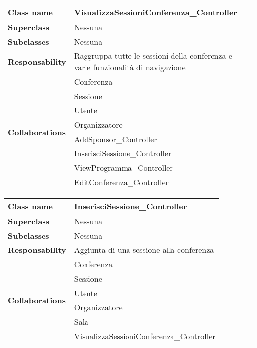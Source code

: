 \begin{table}[h!]
	\begin{tabular}{|l|l|}
		\hline 
		\textbf{Class name} & VisualizzaSessioniConferenza\_Controller
		\\ \hline
		\textbf{Superclass} & Nessuna
		\\ \hline
		\multirow{1}{*}{\textbf{Subclasses}} & Nessuna
		\\ \hline
		\textbf{Responsability} & Raggruppa tutte le sessioni della conferenza e varie funzionalità di navigazione
		\\ \hline
		\multirow{8}{*}{\textbf{Collaborations}} & Conferenza \\
		& Sessione\\
		& Utente\\
		& Organizzatore\\
		& AddSponsor\_Controller\\
		& InserisciSessione\_Controller\\
		& ViewProgramma\_Controller\\
		& EditConferenza\_Controller
		\\ \hline
	\end{tabular}
\end{table}

\begin{table}[h!]
	\begin{tabular}{|l|l|}
		\hline 
		\textbf{Class name} & InserisciSessione\_Controller
		\\ \hline
		\textbf{Superclass} & Nessuna
		\\ \hline
		\multirow{1}{*}{\textbf{Subclasses}} & Nessuna
		\\ \hline
		\textbf{Responsability} & Aggiunta di una sessione alla conferenza
		\\ \hline
		\multirow{6}{*}{\textbf{Collaborations}} & Conferenza \\
		& Sessione\\
		& Utente\\
		& Organizzatore\\
		& Sala\\
		& VisualizzaSessioniConferenza\_Controller
		\\ \hline
	\end{tabular}
\end{table}

